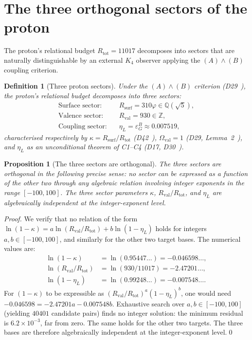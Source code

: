 \documentclass[12pt,a4paper]{article}
\newtheorem{proposition}[theorem]{Proposition}
\newtheorem{definition}[theorem]{Definition}
\newcommand{\Kfour}{K_4}
\newcommand{\Rsurf}{R_{\mathrm{surf}}}
\newcommand{\Rtot}{R_{\mathrm{tot}}}
\newcommand{\Rval}{R_{\mathrm{val}}}
\newcommand{\kap}{\kappa}
\newcommand{\etaL}{\eta_L}
\newcommand{\vp}{\varphi}
\newcommand{\Ov}{\Omega_{\mathrm{val}}}
\begin{document}
\section{The three orthogonal sectors of the proton}
\label{sec:sectors}

The proton's relational budget $\Rtot = 11017$ decomposes into sectors that are naturally distinguishable by an external $\Kfour$ observer applying the $(A)\wedge(B)$ coupling criterion.

\begin{definition}[Three proton sectors]
\label{def:sectors}
Under the $(A)\wedge(B)$ criterion (D29~\cite{PDL_D29_2026}), the proton's relational budget decomposes into three sectors:
\begin{align}
\text{Surface sector:} &\quad \Rsurf = 310\vp \in \mathbb{Q}(\sqrt{5}), \label{eq:surf} \\
\text{Valence sector:} &\quad \Rval = 930 \in \mathbb{Z}, \label{eq:val} \\
\text{Coupling sector:} &\quad \etaL = \varepsilon_G^B \approx 0.007519, \label{eq:coup}
\end{align}
characterised respectively by $\kap = \Rsurf/\Rtot$ (D42~\cite{PDL_D42_2026}), $\Ov = 1$ (D29, Lemma~2~\cite{PDL_D29_2026}), and $\etaL$ as an unconditional theorem of C1--C4 (D17, D30~\cite{PDL_D17_2026,PDL_D30_2026}).
\end{definition}

\begin{proposition}[The three sectors are orthogonal]
\label{prop:orthogonal}
The three sectors are orthogonal in the following precise sense: no sector can be expressed as a function of the other two through any algebraic relation involving integer exponents in the range $[-100, 100]$. The three sector parameters $\kap$, $\Rval/\Rtot$, and $\etaL$ are algebraically independent at the integer-exponent level.
\end{proposition}

\begin{proof}
We verify that no relation of the form $\ln(1-\kap) = a\ln(\Rval/\Rtot) + b\ln(1-\etaL)$ holds for integers $a, b \in [-100, 100]$, and similarly for the other two target bases. The numerical values are:
\begin{align*}
\ln(1-\kap) &= \ln(0.95447\ldots) = -0.046598\ldots, \\
\ln(\Rval/\Rtot) &= \ln(930/11017) = -2.47201\ldots, \\
\ln(1-\etaL) &= \ln(0.99248\ldots) = -0.007548\ldots.
\end{align*}
For $(1-\kap)$ to be expressible as $(\Rval/\Rtot)^a (1-\etaL)^b$, one would need $-0.046598 = -2.47201 a - 0.007548 b$. Exhaustive search over $a, b \in [-100,100]$ (yielding $40401$ candidate pairs) finds no integer solution: the minimum residual is $6.2 \times 10^{-3}$, far from zero. The same holds for the other two targets. The three bases are therefore algebraically independent at the integer-exponent level.\qed
\end{proof}
\end{document}
